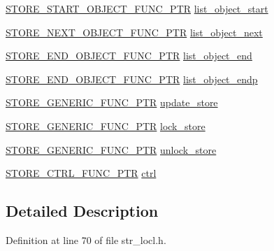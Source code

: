 \begin{DoxyCompactItemize}
\item 
\hyperlink{store_8h_aef80eeacfa0ba1cea7b237ed12a150dd}{S\+T\+O\+R\+E\+\_\+\+S\+T\+A\+R\+T\+\_\+\+O\+B\+J\+E\+C\+T\+\_\+\+F\+U\+N\+C\+\_\+\+P\+TR} \hyperlink{structstore__method__st_a425a7d9ddf6fc8d812ca7ddff207469a}{list\+\_\+object\+\_\+start}
\item 
\hyperlink{store_8h_a8fd1e48e729b9f1a9447aa82ac274b3e}{S\+T\+O\+R\+E\+\_\+\+N\+E\+X\+T\+\_\+\+O\+B\+J\+E\+C\+T\+\_\+\+F\+U\+N\+C\+\_\+\+P\+TR} \hyperlink{structstore__method__st_a082d7b5d4f3b9ad2e7fd8390ab971d8b}{list\+\_\+object\+\_\+next}
\item 
\hyperlink{store_8h_ababf9e1bd818fca98ebe32a2d1a2b644}{S\+T\+O\+R\+E\+\_\+\+E\+N\+D\+\_\+\+O\+B\+J\+E\+C\+T\+\_\+\+F\+U\+N\+C\+\_\+\+P\+TR} \hyperlink{structstore__method__st_a45c20cdfb95dad1c9acf166cdd6fec52}{list\+\_\+object\+\_\+end}
\item 
\hyperlink{store_8h_ababf9e1bd818fca98ebe32a2d1a2b644}{S\+T\+O\+R\+E\+\_\+\+E\+N\+D\+\_\+\+O\+B\+J\+E\+C\+T\+\_\+\+F\+U\+N\+C\+\_\+\+P\+TR} \hyperlink{structstore__method__st_ae99e773fdb1afe5b1506a2e9aded1d73}{list\+\_\+object\+\_\+endp}
\item 
\hyperlink{store_8h_a825cf322399abfa0c6a29bf59029ef57}{S\+T\+O\+R\+E\+\_\+\+G\+E\+N\+E\+R\+I\+C\+\_\+\+F\+U\+N\+C\+\_\+\+P\+TR} \hyperlink{structstore__method__st_ad6fe219f478c6e2362c08f1989e09ae4}{update\+\_\+store}
\item 
\hyperlink{store_8h_a825cf322399abfa0c6a29bf59029ef57}{S\+T\+O\+R\+E\+\_\+\+G\+E\+N\+E\+R\+I\+C\+\_\+\+F\+U\+N\+C\+\_\+\+P\+TR} \hyperlink{structstore__method__st_a797b864328536eadc3ebd572ae7c231d}{lock\+\_\+store}
\item 
\hyperlink{store_8h_a825cf322399abfa0c6a29bf59029ef57}{S\+T\+O\+R\+E\+\_\+\+G\+E\+N\+E\+R\+I\+C\+\_\+\+F\+U\+N\+C\+\_\+\+P\+TR} \hyperlink{structstore__method__st_a402d48f9c42088ff7d53a0f45afd7c8f}{unlock\+\_\+store}
\item 
\hyperlink{store_8h_aad8ce158be5c5f5e9c94aa5795d2df7b}{S\+T\+O\+R\+E\+\_\+\+C\+T\+R\+L\+\_\+\+F\+U\+N\+C\+\_\+\+P\+TR} \hyperlink{structstore__method__st_a3ea532ae62a9efaaec780a90b14c4192}{ctrl}
\end{DoxyCompactItemize}


\subsection{Detailed Description}


Definition at line 70 of file str\+\_\+locl.\+h.



